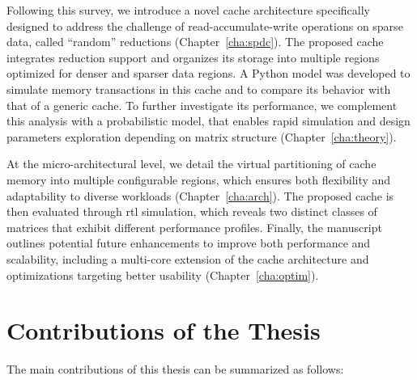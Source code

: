 Following this survey, we introduce a novel cache architecture specifically designed to address the challenge of read-accumulate-write operations on sparse data, called ``random'' \glspl{reduction} (Chapter~\ref{cha:spdc}).
The proposed cache integrates \gls{reduction} support and organizes its storage into multiple regions optimized for denser and sparser data regions.
A Python model was developed to simulate memory transactions in this cache and to compare its behavior with that of a generic cache.
To further investigate its performance, we complement this analysis with a probabilistic model, that enables rapid simulation and design parameters exploration depending on matrix structure (Chapter~\ref{cha:theory}).

At the micro-architectural level, we detail the virtual partitioning of cache memory into multiple configurable regions, which ensures both flexibility and adaptability to diverse workloads (Chapter~\ref{cha:arch}).
The proposed cache is then evaluated through \acrshort{rtl} simulation, which reveals two distinct classes of matrices that exhibit different performance profiles.
Finally, the manuscript outlines potential future enhancements to improve both performance and scalability, including a multi-core extension of the cache architecture and optimizations targeting better usability (Chapter~\ref{cha:optim}).

\section*{Contributions of the Thesis}

The main contributions of this thesis can be summarized as follows:

